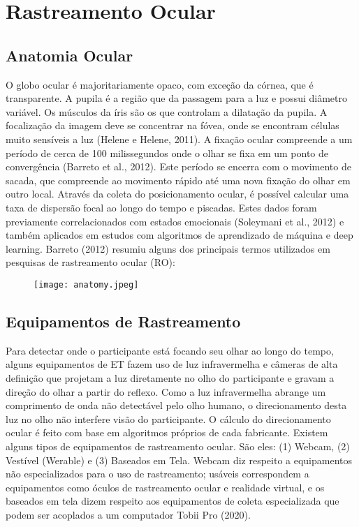 \chapter{Rastreamento Ocular}

\section{Anatomia Ocular}
O globo ocular é majoritariamente opaco, com exceção da córnea, que é transparente. 
A pupila é a região que da passagem para a luz e possui diâmetro variável. Os músculos da íris são os que controlam a dilatação da pupila. 
A focalização da imagem deve se concentrar na fóvea, onde se encontram células muito sensíveis a luz (Helene e Helene, 2011). 
A fixação ocular compreende a um período de cerca de 100 milissegundos onde o olhar se fixa em um ponto de convergência (Barreto et al., 2012). 
Este período se encerra com o movimento de sacada, que compreende ao movimento rápido até uma nova fixação do olhar em outro local.
Através da coleta do posicionamento ocular, é possível calcular uma taxa de dispersão focal ao longo do tempo e piscadas. 
Estes dados foram previamente correlacionados com estados emocionais (Soleymani et al., 2012) e 
também aplicados em estudos com algoritmos de aprendizado de máquina e deep learning. Barreto (2012)
resumiu alguns dos principais termos utilizados em pesquisas de rastreamento ocular (RO):

\begin{figure}[h]
    \centering
    \texttt{[image: anatomy.jpeg]}
    \caption[]{}\label{fig:}
    \end{figure}

\section{Equipamentos de Rastreamento}
Para detectar onde o participante está focando seu olhar ao longo do tempo, alguns equipamentos de ET
 fazem uso de luz infravermelha e câmeras de alta definição que projetam a luz
  diretamente no olho do participante e gravam a direção do olhar a partir do reflexo. 
  Como a luz infravermelha abrange um comprimento de onda não detectável pelo olho humano, 
  o direcionamento desta luz no olho não interfere visão do participante. 
  O cálculo do direcionamento ocular é feito com base em algoritmos próprios de cada fabricante. 
  Existem alguns tipos de equipamentos de rastreamento ocular. São eles: (1) Webcam, (2) Vestível (Werable) e (3) Baseados em Tela. 
  Webcam diz respeito a equipamentos não especializados para o uso de rastreamento; usáveis correspondem a equipamentos como óculos de rastreamento ocular 
  e realidade virtual, e os baseados em tela dizem respeito aos equipamentos de coleta especializada que podem ser acoplados a um computador Tobii Pro (2020).

